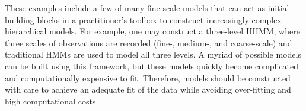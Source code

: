 These examples include a few of many fine-scale models that can act as initial building blocks in a practitioner's toolbox to construct increasingly complex hierarchical models. For example, one may construct a three-level HHMM, where three scales of observations are recorded (fine-, medium-, and coarse-scale) and traditional HMMs are used to model all three levels. A myriad of possible models can be built using this framework, but these models quickly become complicated and computationally expensive to fit. Therefore, models should be constructed with care to achieve an adequate fit of the data while avoiding over-fitting and high computational costs.